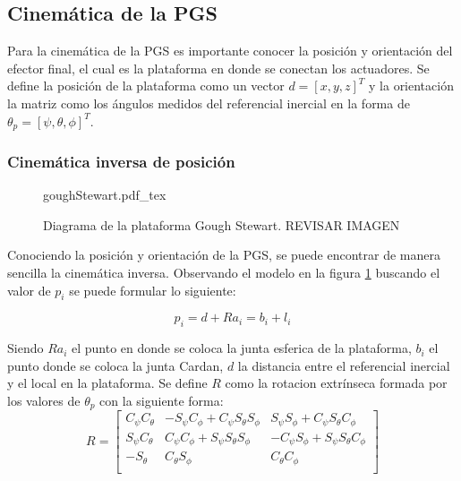 \documentclass[letterpaper, 12pt]{article}
\begin{document}
\subsection{Cinemática de la PGS}
Para la cinemática de la PGS es importante conocer la posición y orientación del 
efector final, el cual es la plataforma en donde se conectan los actuadores. Se 
define la posición de la plataforma como un vector $d = [x,y,z]^T$ y la orientación 
la matriz como los ángulos medidos del referencial inercial en la forma de 
$\theta_p = [\psi,\theta,\phi]^T$.

\subsubsection{Cinemática inversa de posición}

\begin{figure}[ht]
    \centering
    {goughStewart.pdf_tex}
    \caption{Diagrama de la plataforma Gough Stewart. REVISAR IMAGEN}
    \label{fig: gough stewart diagram}
\end{figure}

Conociendo la posición y orientación de la PGS, se puede encontrar de manera sencilla 
la cinemática inversa. Observando el modelo en la figura \ref{fig: gough stewart diagram} 
buscando el valor de $p_i$ se puede formular lo siguiente:

\begin{equation} \label{equ:plat_grl}
p_i = d + Ra_i = b_i + l_i
\end{equation}

Siendo $Ra_i$ el punto en donde se coloca la junta esferica de la plataforma, $b_i$ 
el punto donde se coloca la junta Cardan,  $d$ la distancia entre el referencial 
inercial y el local en la plataforma. Se define $R$ como la rotacion extrínseca formada 
por los valores de $\theta_p$ con la siguiente forma:
\begin{equation} \label{equ:Mrot-P}
R = \begin{bmatrix}
C_\psi C_\theta & -S_\psi C_\phi + C_\psi S_\theta S_\phi & S_\psi S_\phi + C_\psi S_\theta C_\phi\\
S_\psi C_\theta & C_\psi C_\phi + S_\psi S_\theta S_\phi & -C_\psi S_\phi + S_\psi S_\theta C_\phi\\
-S_\theta & C_\theta S_\phi & C_\theta C_\phi\\
\end{bmatrix}
\end{equation}
\end{document}
